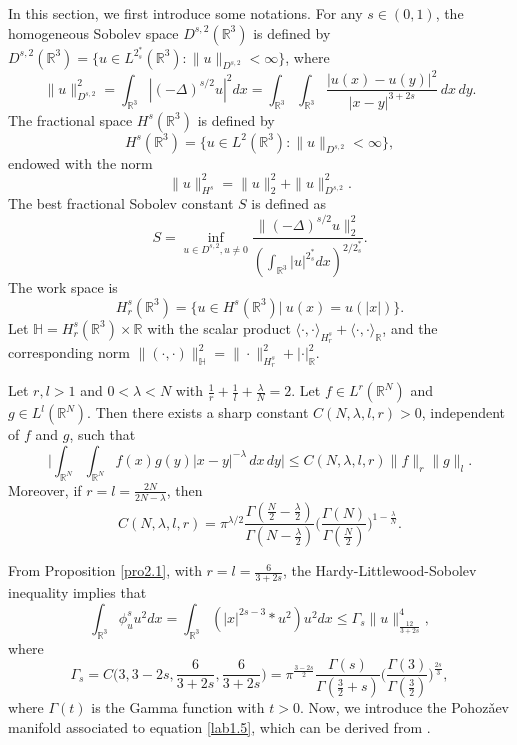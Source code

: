 In this section, we first introduce  some  notations. For any $s\in(0,1)$, the
homogeneous Sobolev space $D^{s,2}(\mathbb{R}^3)$ is defined by
$D^{s,2}(\mathbb{R}^3)=\{u\in L^{2^*_s}(\mathbb{R}^3):\|u\|_{D^{s,2}}<\infty\}$,
where
$$
\|u\|^2_{D^{s,2}}=\int_{\mathbb{R}^3}|(-\Delta)^{s/2}u|^2dx
=\int_{\mathbb{R}^3}\int_{\mathbb{R}^3}\frac{|u(x)-u(y)|^2}{|x-y|^{3+2s}}\,dx\,dy.
$$
The fractional space $H^s(\mathbb{R}^3)$ is defined by
$$
H^s(\mathbb{R}^3)=\{u\in L^2(\mathbb{R}^3): \|u\|_{D^{s,2}}< \infty \},
$$
endowed with the norm
$$
\|u\|^2_{H^s}=\|u\|^2_2+\|u\|^2_{D^{s,2}}.
$$
The best fractional Sobolev constant $S$ is defined as
\begin{equation}\label{2.111}
S=\inf_{u\in D^{s,2}, u\neq 0}
\frac{\|(-\Delta)^{s/2}u\|^2_2}
{(\int_{\mathbb{R}^3}|u|^{2^*_s}dx)^{2/2^*_s}}.
\end{equation}
The work space is
 $$
 H^s_r(\mathbb{R}^3)=\{u \in H^s(\mathbb{R}^3)|~ u(x)=u(|x|)\}.
 $$
Let $\mathbb{H}=H^s_r(\mathbb{R}^3) \times \mathbb{R}$ with the scalar product
$\langle\cdot, \cdot\rangle_{H^s_r}+\langle\cdot, \cdot\rangle_{\mathbb{R}}$, and
the corresponding norm
$\|(\cdot, \cdot)\|^2_\mathbb{H}=\|\cdot\|^2_{H^s_r}+|\cdot|^2_{\mathbb{R}}$.

\begin{proposition} \label{pro2.1}
Let $r,l>1$ and $0<\lambda <N$ with $\frac{1}{r}+\frac{1}{l}+\frac{\lambda}{N}=2$.
Let $f\in L^r(\mathbb{R}^N)$ and $g\in L^l(\mathbb{R}^N)$.
Then there exists a sharp constant $C(N, \lambda, l, r)>0$, independent of $f$ and $g$,
such that
\[
\Big|\int_{\mathbb{R}^N}\int_{\mathbb{R}^N}f(x)g(y)|x-y|^{-\lambda}\,dx\,dy\Big|
\leq C(N, \lambda, l, r)\|f\|_{r}\|g\|_{l}.
\]
Moreover, if $r=l=\frac{2N}{2N-\lambda}$, then
\[
C(N, \lambda, l, r)
=\pi^{\lambda/2}\frac{\Gamma(\frac{N}{2}-\frac{\lambda}{2})}
{\Gamma(N-\frac{\lambda}{2})}\Big(\frac{\Gamma(N)}{\Gamma(\frac{N}{2})}
\Big)^{1-\frac{\lambda}{N}}.
\]
\end{proposition}

From Proposition \ref{pro2.1},  with  $r=l=\frac{6}{3+2s}$, the
 Hardy-Littlewood-Sobolev inequality implies that
\begin{equation}\label{3.3}
\int_{\mathbb{R}^3}\phi^s_u u^2dx=\int_{\mathbb{R}^3}
\left(|x|^{2s-3}\ast u^2\right)u^2dx\leq \Gamma_s\|u\|^4_{\frac{12}{3+2s}},
\end{equation}
where
\[
\Gamma_s=C\big(3, 3-2s, \frac{6}{3+2s}, \frac{6}{3+2s}\big)=\pi^{\frac{3-2s}{2}}
\frac{\Gamma(s)}{\Gamma(\frac{3}{2}+s)}\Big(\frac{\Gamma(3)}
{\Gamma(\frac{3}{2})}\Big)^{\frac{2s}{3}},
\]
where $\Gamma(t)$ is  the Gamma function with $t>0$.
Now, we introduce the Pohoz{\v{a}}ev manifold associated to equation  \eqref{lab1.5},
which can be derived from \cite{T7899}.

